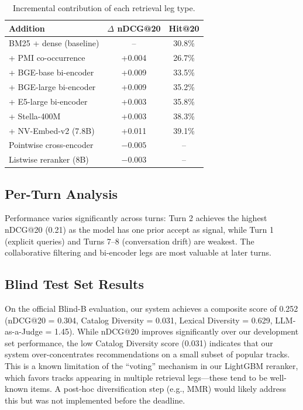 \documentclass[sigconf]{acmart}
\begin{document}
\begin{table}[h]
\centering
\caption{Incremental contribution of each retrieval leg type.}
\label{tab:ablation}
\small
\setlength{\tabcolsep}{4pt}
\begin{tabular}{@{}lcc@{}}
\toprule
Addition & $\Delta$ nDCG@20 & Hit@20 \\
\midrule
BM25 + dense (baseline) & -- & 30.8\% \\
+ PMI co-occurrence & +0.004 & 26.7\% \\
+ BGE-base bi-encoder & +0.009 & 33.5\% \\
+ BGE-large bi-encoder & +0.009 & 35.2\% \\
+ E5-large bi-encoder & +0.003 & 35.8\% \\
+ Stella-400M & +0.003 & 38.3\% \\
+ NV-Embed-v2 (7.8B) & +0.011 & 39.1\% \\
\midrule
Pointwise cross-encoder & $-0.005$ & -- \\
Listwise reranker (8B) & $-0.003$ & -- \\
\bottomrule
\end{tabular}
\end{table}

\subsection{Per-Turn Analysis}

Performance varies significantly across turns: Turn 2 achieves the highest nDCG@20 (0.21) as the model has one prior accept as signal, while Turn 1 (explicit queries) and Turns 7--8 (conversation drift) are weakest. The collaborative filtering and bi-encoder legs are most valuable at later turns.

\subsection{Blind Test Set Results}

On the official Blind-B evaluation, our system achieves a composite score of 0.252 (nDCG@20 = 0.304, Catalog Diversity = 0.031, Lexical Diversity = 0.629, LLM-as-a-Judge = 1.45). While nDCG@20 improves significantly over our development set performance, the low Catalog Diversity score (0.031) indicates that our system over-concentrates recommendations on a small subset of popular tracks. This is a known limitation of the ``voting'' mechanism in our LightGBM reranker, which favors tracks appearing in multiple retrieval legs---these tend to be well-known items. A post-hoc diversification step (e.g., MMR) would likely address this but was not implemented before the deadline.
\end{document}
